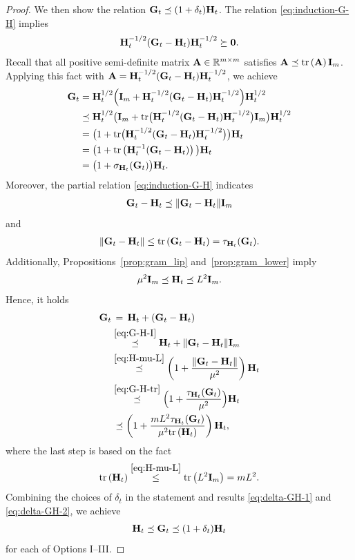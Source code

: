 \documentclass[11pt]{article}
\theoremstyle{plain}
\theoremstyle{definition}
\theoremstyle{remark}
\theoremstyle{plain}
\def\BR{{\mathbb{R}}}
\def\mA {{\bf A}}
\def\mG {{\bf G}}
\def\mI {{\bf I}}
\def\BR{{\mathbb{R}}}
\def\A{{\bf A}}
\def\G{{\bf G}}
\def\H{{\bf H}}
\def\I{{\bf I}}
\def\0{{\bf 0}}
\def \tr #1{\text{\rm tr}\left(#1\right)}
\begin{document}
\begin{proof}
We then show the relation $\mG_t\preceq(1+\delta_t)\H_t$.
The relation \eqref{eq:induction-G-H} implies
\begin{align*}
\H_t^{-1/2}(\G_t-\H_t)\H_t^{-1/2}\succeq\0.
\end{align*}
Recall that all positive semi-definite matrix $\A\in\BR^{m\times m}$ satisfies
$\A\preceq\tr{\A}\I_m$. 
Applying this fact with $\mA=\H_t^{-1/2}(\G_t-\H_t)\H_t^{-1/2}$, we achieve
\begin{align}\label{eq:delta-GH-1}
\begin{split}    
\G_t
&=\H_t^{1/2}\Bigl(\I_m+\H_t^{-1/2}(\G_t-\H_t)\H_t^{-1/2}\Bigr)\H_t^{1/2}\\
&\preceq\H_t^{1/2}\big(\I_m+{\rm tr}\big(\H_t^{-1/2}(\G_t-\H_t)\H_t^{-1/2}\big)\I_m\big)\H_t^{1/2}\\
&=\big(1+{\rm tr}\big(\H_t^{-1/2}(\G_t-\H_t)\H_t^{-1/2}\big)\big)\H_t\\
&=\big(1+\tr{\H_t^{-1}(\G_t-\H_t)}\big)\H_t \\
&=\big(1+\sigma_{\H_t}(\G_t)\big)\H_t.
\end{split}
\end{align}
Moreover, the partial relation \eqref{eq:induction-G-H} indicates
\begin{align}\label{eq:G-H-I}
\G_t-\H_t\preceq\|\G_t-\H_t\|\I_m     
\end{align}
and
\begin{align}\label{eq:G-H-tr}
\|\G_t-\H_t\|\leq\tr{\G_t-\H_t}=\tau_{\H_t}(\G_t).     
\end{align}
Additionally, Propositions~\ref{prop:gram_lip} and~\ref{prop:gram_lower} imply
\begin{align}\label{eq:H-mu-L}
\mu^2\I_m\preceq\H_t\preceq L^2\I_m.    
\end{align}
Hence, it holds
\begin{align}\label{eq:delta-GH-2}
\begin{split}
\G_t
&\,=\,\H_t+(\G_t-\H_t)\\
&\overset{\eqref{eq:G-H-I}}\preceq\H_t+\|\G_t-\H_t\|\I_m\\
&\overset{\eqref{eq:H-mu-L}}\preceq\left(1+\frac{\|\G_t-\H_t\|}{\mu^2}\right)\H_t \\
&\overset{\eqref{eq:G-H-tr}}\preceq\Bigl(1+\frac{\tau_{\H_t}(\G_t)}{\mu^2}\Bigr)\H_t\\
&\,\preceq\left(1+
\frac{mL^2\tau_{\H_t}(\G_t)}
{\mu^2\tr{\H_t}}\right)\H_t,
\end{split}
\end{align}
where the last step is based on the fact
\begin{align*}
    \tr{\H_t} \overset{\eqref{eq:H-mu-L}}\leq \tr{L^2\mI_m} = mL^2.
\end{align*}
Combining the choices of $\delta_t$ in the statement and results
\eqref{eq:delta-GH-1} and \eqref{eq:delta-GH-2},
we achieve 
\begin{align*}
\H_t\preceq\G_t\preceq(1+\delta_t)\H_t     
\end{align*}
for each of Options I--III.





\end{proof}
\end{document}
